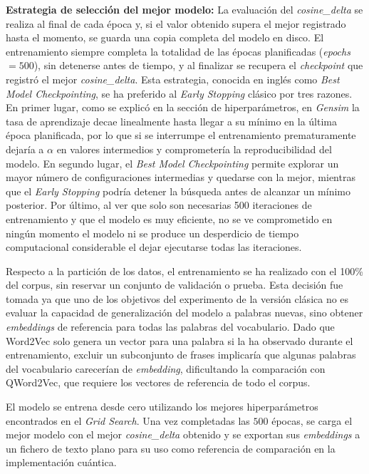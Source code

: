 \textbf{Estrategia de selección del mejor modelo:} La evaluación del \textit{cosine\_delta} se realiza al final de cada época y, si el valor obtenido supera el mejor registrado hasta el momento, se guarda una copia completa del modelo en disco. El entrenamiento siempre completa la totalidad de las épocas planificadas (\textit{epochs} $= 500$), sin detenerse antes de tiempo, y al finalizar se recupera el \textit{checkpoint} que registró el mejor \textit{cosine\_delta}. Esta estrategia, conocida en inglés como \textit{Best Model Checkpointing}, se ha preferido al \textit{Early Stopping} clásico por tres razones. En primer lugar, como se explicó en la sección de hiperparámetros, en \textit{Gensim} la tasa de aprendizaje decae linealmente hasta llegar a su mínimo en la última época planificada, por lo que si se interrumpe el entrenamiento prematuramente dejaría a $\alpha$ en valores intermedios y comprometería la reproducibilidad del modelo. En segundo lugar, el \textit{Best Model Checkpointing} permite explorar un mayor número de configuraciones intermedias y quedarse con la mejor, mientras que el \textit{Early Stopping} podría detener la búsqueda antes de alcanzar un mínimo posterior. Por último, al ver que solo son necesarias 500 iteraciones de entrenamiento y que el modelo es muy eficiente, no se ve comprometido en ningún momento el modelo ni se produce un desperdicio de tiempo computacional considerable el dejar ejecutarse todas las iteraciones.

Respecto a la partición de los datos, el entrenamiento se ha realizado con el 100\% del corpus, sin reservar un conjunto de validación o prueba. Esta decisión fue tomada ya que uno de los objetivos del experimento de la versión clásica no es evaluar la capacidad de generalización del modelo a palabras nuevas, sino obtener \textit{embeddings} de referencia para todas las palabras del vocabulario. Dado que Word2Vec solo genera un vector para una palabra si la ha observado durante el entrenamiento, excluir un subconjunto de frases implicaría que algunas palabras del vocabulario carecerían de \textit{embedding}, dificultando la comparación con QWord2Vec, que requiere los vectores de referencia de todo el corpus.

El modelo se entrena desde cero utilizando los mejores hiperparámetros encontrados en el \textit{Grid Search}. Una vez completadas las $500$ épocas, se carga el mejor modelo con el mejor \textit{cosine\_delta} obtenido y se exportan sus \textit{embeddings} a un fichero de texto plano para su uso como referencia de comparación en la implementación cuántica.

